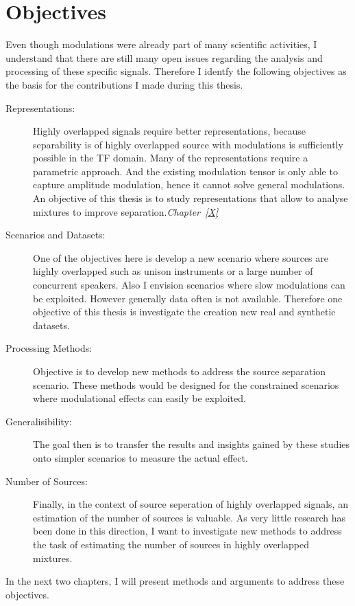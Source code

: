 \section{Objectives}

Even though modulations were already part of many scientific activities, I understand that there are still many open issues regarding the analysis and processing of these specific signals.
Therefore I identfy the following objectives as the basis for the contributions I made during this thesis.
\begin{description}
  \item[Representations:] Highly overlapped signals require better representations, because separability is of highly overlapped source with modulations is sufficiently possible in the TF domain.
    Many of the representations require a parametric approach. And the existing modulation tensor is only able to capture amplitude modulation, hence it cannot solve general modulations.
    An objective of this thesis is to study representations that allow to analyse mixtures to improve separation.\emph{Chapter~\ref{X}}
  \item[Scenarios and Datasets:] One of the objectives here is develop a new scenario where sources are highly overlapped such   as unison instruments or a large number of concurrent speakers. Also I envision scenarios where slow modulations can be      exploited. However generally data often is not available. Therefore one objective of this thesis is investigate the          creation new real and synthetic datasets.
  \item[Processing Methods:] Objective is to develop new methods to address the source separation scenario. These methods would be designed for the constrained scenarios where modulational effects can easily be exploited.
  \item[Generalisibility:] The goal then is to transfer the results and insights gained by these
    studies onto simpler scenarios to measure the actual effect.
  \item[Number of Sources:] Finally, in the context of source seperation of highly overlapped signals, an estimation of the number of sources is valuable. As very little research has been done in this direction, I want to investigate new methods to address the task of estimating the number of sources in highly overlapped mixtures.
\end{description}

In the next two chapters, I will present methods and arguments to address these objectives.
